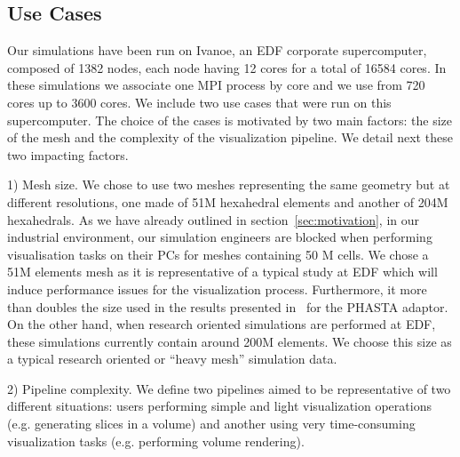 \subsection{Use Cases}

Our simulations have been run on Ivanoe, an EDF corporate supercomputer,
composed of 1382 nodes, each node having 12 cores for a total of 16584 cores. In
these simulations we associate one MPI process by core and we use from 720 cores up
to 3600 cores. We include two use cases that were run on this supercomputer. The
choice of the cases is motivated by two main factors: the size of the mesh and
the complexity of the visualization pipeline. We detail next these two impacting factors.

1) Mesh size. We chose to use two meshes representing the same geometry but at
different resolutions, one made of 51M hexahedral elements and another of 204M
hexahedrals. As we have already outlined in section~\ref{sec:motivation}, in our industrial environment, our
simulation engineers are blocked when performing visualisation tasks on their
PCs for meshes containing 50 M cells.
We chose a 51M elements mesh as it is representative of a typical study 
at EDF which will induce performance issues for the visualization process.
Furthermore, it more than doubles the size used in the results
presented in~\cite{6092322} for the PHASTA adaptor. On the other hand, when research
oriented simulations are performed at EDF, these simulations currently contain around 200M
elements. We choose this size as a typical research oriented or ``heavy mesh'' simulation data.

2) Pipeline complexity. We define two pipelines aimed to be representative of two
different situations: users performing simple and light visualization
operations (e.g. generating slices in a volume) and another using very
time-consuming visualization tasks (e.g. performing volume rendering).

